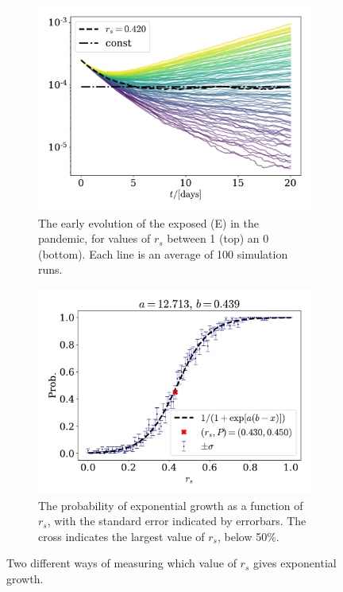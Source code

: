 \documentclass{article}
\begin{document}
    \begin{figure}[H]
        \centering
        \begin{subfigure}{.49\textwidth}
            \includegraphics[width=\textwidth]{../plots/2C/isolation.pdf}
            \caption{The early evolution of the exposed (E) in the pandemic, for values of $r_s$ between 1 (top) an 0 (bottom).
             Each line is an average of 100 simulation runs.}
            \label{isolation1}
        \end{subfigure}
        \begin{subfigure}{.49\textwidth}
            \includegraphics[width=\textwidth]{../plots/2C/isolation2_prob.pdf}
            \caption{The probability of exponential growth as a function of $r_s$, with the standard error indicated by errorbars.
            The cross indicates the largest value of $r_s$, below 50\%.}
            \label{isolation2}
        \end{subfigure}
        \caption{Two different ways of measuring which value of $r_s$ gives exponential growth.}
        \label{isolation}
    \end{figure}
\end{document}
